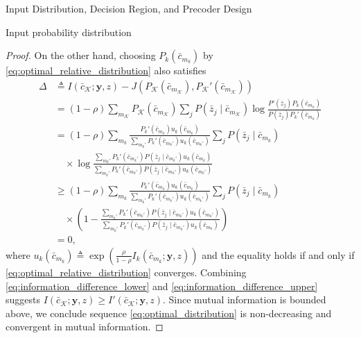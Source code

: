 \documentclass[journal]{IEEEtran}
\begin{document}
\begin{section}{Input Distribution, Decision Region, and Precoder Design}
\begin{subsection}{Input probability distribution}
\begin{proof}
				On the other hand, choosing $P_k(\bar{c}_{m_k})$ by \eqref{eq:optimal_relative_distribution} also satisfies
				\begin{subequations}
					\label{eq:information_difference_upper}
					\begin{align}
						\Delta
						& \triangleq I(\bar{c}_{\mathcal{K}};\boldsymbol{y},z) - J \left( P_{\mathcal{K}}(\bar{c}_{m_{\mathcal{K}}}),P_{\mathcal{K}}'(\bar{c}_{m_{\mathcal{K}}}) \right)\\
						& = (1 - \rho) \sum_{m_{\mathcal{K}}} P_{\mathcal{K}}(\bar{c}_{m_{\mathcal{K}}}) \sum_j P(\bar{z}_j \mid \bar{c}_{m_{\mathcal{K}}}) \log \frac{P'(\bar{z}_j) P_k(\bar{c}_{m_k})}{P(\bar{z}_j) P_k'(\bar{c}_{m_k})}\\
						& = (1 - \rho) \sum_{m_k} \frac{P_k'(\bar{c}_{m_k}) u_k(\bar{c}_{m_k})}{\sum_{m_k'} P_k'(\bar{c}_{m_k'}) u_k(\bar{c}_{m_k'})} \sum_j P(\bar{z}_j \mid \bar{c}_{m_k})\nonumber\\
						& \quad \times \log \frac{\sum_{m_k'} P_k'(\bar{c}_{m_k'}) P(\bar{z}_j \mid \bar{c}_{m_k'}) u_k(\bar{c}_{m_k})}{\sum_{m_k'} P_k'(\bar{c}_{m_k'}) P(\bar{z}_j \mid \bar{c}_{m_k'}) u_k(\bar{c}_{m_k'})}\\
						& \ge (1 - \rho) \sum_{m_k} \frac{P_k'(\bar{c}_{m_k}) u_k(\bar{c}_{m_k})}{\sum_{m_k'} P_k'(\bar{c}_{m_k'}) u_k(\bar{c}_{m_k'})} \sum_j P(\bar{z}_j \mid \bar{c}_{m_k})\nonumber\\
						& \quad \times \left( 1 - \frac{\sum_{m_k'} P_k'(\bar{c}_{m_k'}) P(\bar{z}_j \mid \bar{c}_{m_k'}) u_k(\bar{c}_{m_k'})}{\sum_{m_k'} P_k'(\bar{c}_{m_k'}) P(\bar{z}_j \mid \bar{c}_{m_k'}) u_k(\bar{c}_{m_k})} \right)\\
						& = 0,
					\end{align}
				\end{subequations}
				where $u_k(\bar{c}_{m_k}) \triangleq \exp \left( \frac{\rho}{1 - \rho} I_k(\bar{c}_{m_k};\boldsymbol{y},z) \right)$ and the equality holds if and only if \eqref{eq:optimal_relative_distribution} converges. Combining \eqref{eq:information_difference_lower} and \eqref{eq:information_difference_upper} suggests $I(\bar{c}_{\mathcal{K}};\boldsymbol{y},z) \ge I'(\bar{c}_{\mathcal{K}};\boldsymbol{y},z)$. Since mutual information is bounded above, we conclude sequence \eqref{eq:optimal_distribution} is non-decreasing and convergent in mutual information.


\end{proof}
\end{subsection}
\end{section}
\end{document}
